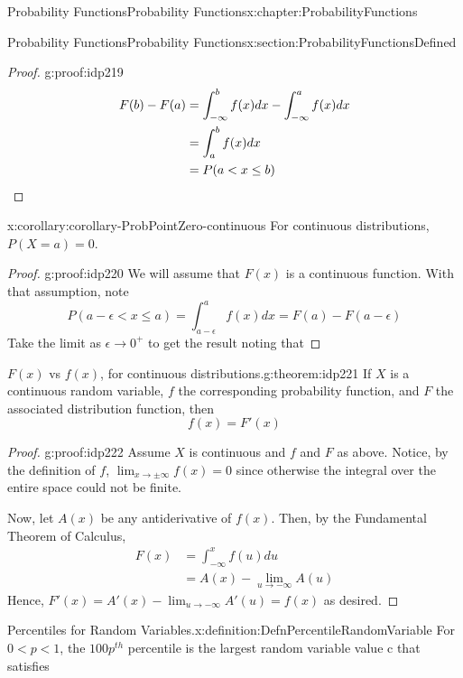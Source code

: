\documentclass[oneside,10pt,]{book}
\newcommand{\qedhere}{\relax}
\numberwithin{equation}{section}
\newcommand{\lt}{<}
\begin{document}
\begin{chapterptx}{Probability Functions}{}{Probability Functions}{}{}{x:chapter:ProbabilityFunctions}
\begin{sectionptx}{Probability Functions}{}{Probability Functions}{}{}{x:section:ProbabilityFunctionsDefined}
\begin{proof}{}{g:proof:idp219}
\begin{align*}
F(b) - F(a) & = \int_{-\infty}^b f(x) dx - \int_{-\infty}^a f(x) dx\\
& = \int_a^b f(x) dx \\
& = P(a \lt x \le b)\qedhere
\end{align*}
%
\end{proof}
%
\par
\begin{corollary}{}{}{x:corollary:corollary-ProbPointZero-continuous}%
For continuous distributions, \(P(X = a) = 0\).%
\end{corollary}
\begin{proof}{}{g:proof:idp220}
We will assume that \(F(x)\) is a continuous function. With that assumption, note%
\begin{equation*}
P(a-\epsilon \lt  x \le a)  = \int_{a-\epsilon}^a f(x) dx = F(a) - F(a-\epsilon)
\end{equation*}
Take the limit as \(\epsilon \rightarrow 0^+\) to get the result noting that%
\end{proof}
%
\par
\begin{theorem}{\(F(x)\) vs \(f(x)\), for continuous distributions.}{}{g:theorem:idp221}%
If \(X\) is a continuous random variable, \(f\) the corresponding probability function, and \(F\) the associated distribution function, then%
\begin{equation*}
f(x) = F'(x)
\end{equation*}
%
\end{theorem}
\begin{proof}{}{g:proof:idp222}
Assume \(X\) is continuous and \(f\) and \(F\) as above. Notice, by the definition of \(f\), \(\lim_{x \rightarrow \pm \infty} f(x) = 0\) since otherwise the integral over the entire space could not be finite.%
\par
Now, let \(A(x)\) be any antiderivative of \(f(x)\). Then, by the Fundamental Theorem of Calculus,%
\begin{align*}
F(x) & = \int_{-\infty}^x f(u) du\\
& = A(x) - \lim_{u \rightarrow -\infty} A(u)
\end{align*}
Hence, \(F'(x) = A'(x) - \lim_{u \rightarrow -\infty} A'(u) = f(x)\) as desired.%
\end{proof}
%
\par
\begin{definition}{Percentiles for Random Variables.}{x:definition:DefnPercentileRandomVariable}%
For \(0 \lt p \lt 1\), the \(100p^{th}\) percentile is the largest random variable value c that satisfies%

\end{definition}
\end{sectionptx}
\end{chapterptx}
\end{document}
